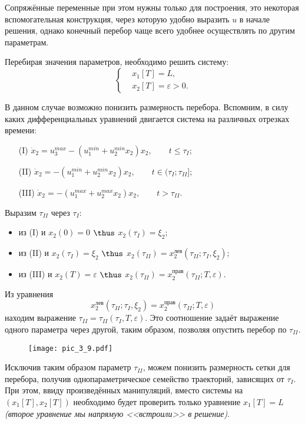 Сопряжённые переменные при этом нужны только для построения, это некоторая вспомогательная конструкция, через которую удобно выразить $u$ в начале решения, однако конечный перебор чаще всего удобнее осуществлять по другим параметрам.

Перебирая значения параметров, необходимо решить систему:
$$
    \left\{
        \begin{aligned}
            & x_1[T] = L, \\
            & x_2[T] = \varepsilon > 0.
        \end{aligned}
    \right.
$$

В данном случае возможно понизить размерность перебора. Вспомним, в силу каких дифференциальных уравнений двигается система на различных отрезках времени:
\begin{enumerate}
    \item[(I)] $\dot{x}_2 = u_3^{max} - (u_1^{min} + u_2^{min} x_2) x_2, \qquad t \leqslant \tau_{I}$;
    \item[(II)] $\dot{x}_2 = - (u_1^{min} + u_2^{min} x_2) x_2, \qquad t \in (\tau_I; \tau_{II}]$;
    \item[(III)] $\dot{x}_2 = - (u_1^{max} + u_2^{max} x_2) x_2, \qquad t > \tau_{II}$. 
\end{enumerate}

Выразим $\tau_{II}$ через $\tau_{I}$:
\begin{itemize}
    \item из (I) и $x_2(0) = 0$ $\thus$ $x_2(\tau_{I}) = \xi_2$;
    \item из (II) и $x_2(\tau_{I}) = \xi_2$ $\thus$ $x_2(\tau_{II}) = x_2^{\text{лев}}(\tau_{II}; \tau_{I}, \xi_2)$;
    \item из (III) и $x_2(T) = \varepsilon$ $\thus$ $x_2(\tau_{II}) = x_2^{\text{прав}}(\tau_{II}; T, \varepsilon)$.
\end{itemize}
Из уравнения
$$
    x_2^{\text{лев}}(\tau_{II}; \tau_{I}, \xi_2) = x_2^{\text{прав}}(\tau_{II}; T, \varepsilon)
$$
находим выражение $\tau_{II} = \tau_{II}(\tau_{I}, T, \varepsilon)$. Это соотношение задаёт выражение одного параметра через другой, таким образом, позволяя опустить перебор по $\tau_{II}$.

\begin{figure}[H]
    \centering
    \texttt{[image: pic\_3\_9.pdf]}
\end{figure}

Исключив таким образом параметр $\tau_{II}$, можем понизить размерность сетки для перебора, получив однопараметрическое семейство траекторий, зависящих от $\tau_{I}$. При этом, ввиду произведённых манипуляций, вместо системы на $(x_1[T], x_2[T])$ необходимо будет проверить только уравнение $x_1[T] = L$ \textit{(второе уравнение мы напрямую <<встроили>> в решение)}.

